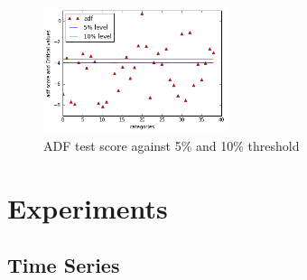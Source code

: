 \documentclass[11pt,conference]{IEEEtran}
\begin{document}
\begin{figure}%
\begin{center}
\includegraphics [width=0.48\textwidth]{pics/adf_test.png}
\caption{ADF test score against 5\% and 10\% threshold }
\end{center}
\end{figure}

\section{Experiments}
\subsection{Time Series}
\end{document}
